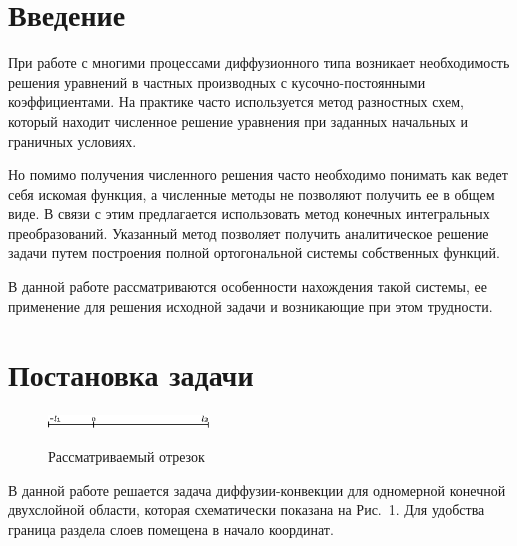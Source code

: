 \documentclass[12pt, a4paper]{article}
\begin{document}
\newpage
\renewcommand{\contentsname}{Содержание}
\tableofcontents

\newpage
\section{Введение}
При работе с многими процессами диффузионного типа возникает необходимость решения уравнений
в частных производных с кусочно-постоянными коэффициентами.
На практике часто используется метод разностных схем, который находит численное решение уравнения при
заданных начальных и граничных условиях.

Но помимо получения численного решения часто необходимо понимать как ведет себя искомая функция, а численные методы не позволяют получить ее в общем виде.
В связи с этим предлагается использовать метод конечных интегральных преобразований.
Указанный метод позволяет получить аналитическое решение задачи путем построения полной ортогональной
системы собственных функций.

В данной работе рассматриваются особенности нахождения такой системы, ее применение для решения исходной задачи
и возникающие при этом трудности.

\section{Постановка задачи}
\begin{figure}
  \centering
  \label{fig1}
  \includegraphics[width=0.38\textwidth]{fig1.eps}
  \\
  \caption{Рассматриваемый отрезок}
\end{figure}
В данной работе решается задача диффузии-конвекции для одномерной конечной двухслойной области, которая схематически показана на Рис.~1. Для удобства граница раздела слоев помещена в начало координат.
\end{document}
